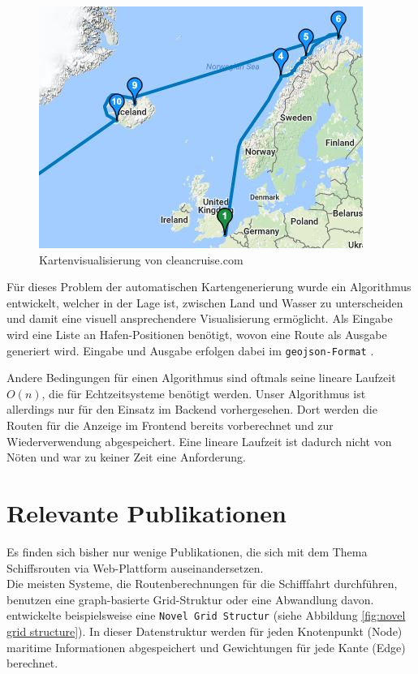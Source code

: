 \documentclass[letterpaper]{article}
\begin{document}
	\begin{figure}[!htb]
		\begin{center}
		\includegraphics[width=.6\linewidth]{state_of_the_art_cleancruise}
		\caption{Kartenvisualisierung von cleancruise.com}
		\label{fig:state of the art cleancruise}
		\end{center}
	\end{figure}

	 Für dieses Problem der automatischen Kartengenerierung wurde ein Algorithmus entwickelt, welcher in der Lage ist, zwischen Land und Wasser zu unterscheiden und damit eine visuell ansprechendere Visualisierung ermöglicht. Als Eingabe wird eine Liste an Hafen-Positionen benötigt, wovon eine Route als Ausgabe generiert wird. Eingabe und Ausgabe erfolgen dabei im \texttt{geojson-Format} \cite{rfc7946}.

	Andere Bedingungen für einen Algorithmus sind oftmals seine lineare Laufzeit $O(n)$, die für Echtzeitsysteme benötigt werden. Unser Algorithmus ist allerdings nur für den Einsatz im Backend vorhergesehen. Dort werden die Routen für die Anzeige im Frontend bereits vorberechnet und zur Wiederverwendung abgespeichert. Eine lineare Laufzeit ist dadurch nicht von Nöten und war zu keiner Zeit eine Anforderung.

\section{Relevante Publikationen}
	Es finden sich bisher nur wenige Publikationen, die sich mit dem Thema Schiffsrouten via Web-Plattform auseinandersetzen.\\

	Die meisten Systeme, die Routenberechnungen für die Schifffahrt durchführen, benutzen eine graph-basierte Grid-Struktur oder eine Abwandlung davon. \cite{makrygiorgos15} entwickelte beispielsweise eine \texttt{Novel Grid Structur} (siehe Abbildung \ref{fig:novel grid structure}). In dieser Datenstruktur werden für jeden Knotenpunkt (Node) maritime Informationen abgespeichert und Gewichtungen für jede Kante (Edge) berechnet.
\end{document}
